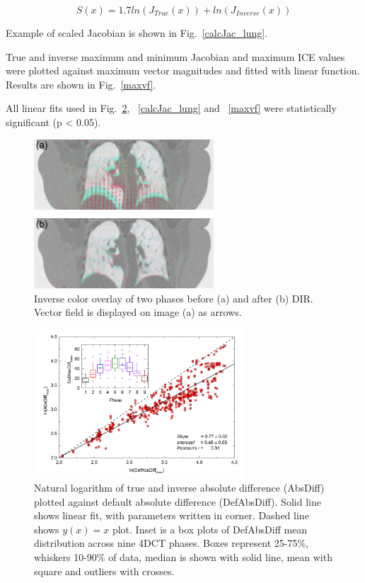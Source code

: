 \documentclass[type=dr, dr=rernat, accentcolor=tud7b,colorbacktitle, bigchapter, openright, twoside, 12pt ]{tudthesis}
\begin{document}
\begin{equation}
S(x) = 1.7 ln(J_{True}(x)) + ln(J_{Inverse}(x))
\end{equation}

Example of scaled Jacobian is shown in Fig.~\ref{calcJac_lung}.

True and inverse maximum and minimum Jacobian and maximum ICE values were plotted against maximum vector magnitudes and fitted with linear function. Results are shown in Fig.~\ref{maxvf}.

All linear fits used in Fig.~\ref{absDiff_lung}, ~\ref{calcJac_lung} and ~\ref{maxvf} were statistically significant (p < 0.05).

\begin{figure}[H]
	\begin{center}		
		\includegraphics[width=0.6\textwidth]{./Images/exampleReg.png}
		\caption{Inverse color overlay of two phases before (a) and after (b) DIR. Vector field is displayed on image (a) as arrows.}
		\label{exampleReg_lung}
	\end{center}
\end{figure}



\begin{figure}[H]
	\begin{center}		
		\includegraphics[width=0.7\textwidth]{./Images/absDiff.png}
		\caption{Natural logarithm of true and inverse absolute difference (AbsDiff) plotted against default absolute difference (DefAbsDiff). Solid line shows linear fit, with parameters
		written in corner. Dashed line shows $y(x)=x$ plot. Inset is a box plots of DefAbsDiff mean distribution across nine 4DCT phases. Boxes represent 25-75\%, whiskers 10-90\%
		of data, median is shown with solid line, mean with square and outliers with crosses.}
		\label{absDiff_lung}
	\end{center}
\end{figure}
\end{document}
